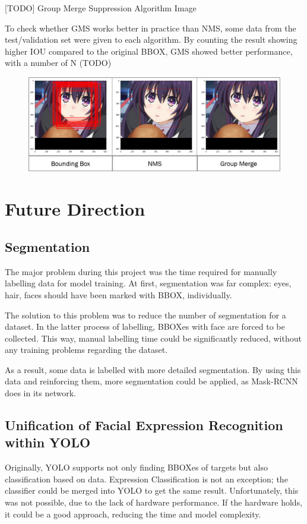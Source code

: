 \documentclass{article}
\begin{document}
[TODO] Group Merge Suppression Algorithm Image

To check whether GMS works better in practice than NMS, some data from the
test/validation set were given to each algorithm. By counting the result showing
higher IOU compared to the original BBOX, GMS showed better performance, with a
number of N (TODO)

\begin{figure}[h]
  \centering
  \includegraphics{image/GMSvsNMS.png}
\end{figure}

\section{Future Direction}
\subsection{Segmentation}
The major problem during this project was the time required for manually
labelling data for model training. At first, segmentation was far complex: eyes,
hair, faces should have been marked with BBOX, individually.

The solution to this problem was to reduce the number of segmentation for a
dataset. In the latter process of labelling, BBOXes with face are forced to be
collected. This way, manual labelling time could be significantly reduced,
without any training problems regarding the dataset.

As a result, some data is labelled with more detailed segmentation. By using
this data and reinforcing them, more segmentation could be applied, as Mask-RCNN
does in its network.

\subsection{Unification of Facial Expression Recognition within YOLO}
Originally, YOLO supports not only finding BBOXes of targets but also
classification based on data. Expression Classification is not an exception; the
classifier could be merged into YOLO to get the same result. Unfortunately, this
was not possible, due to the lack of hardware performance. If the hardware
holds, it could be a good approach, reducing the time and model complexity.
\end{document}

